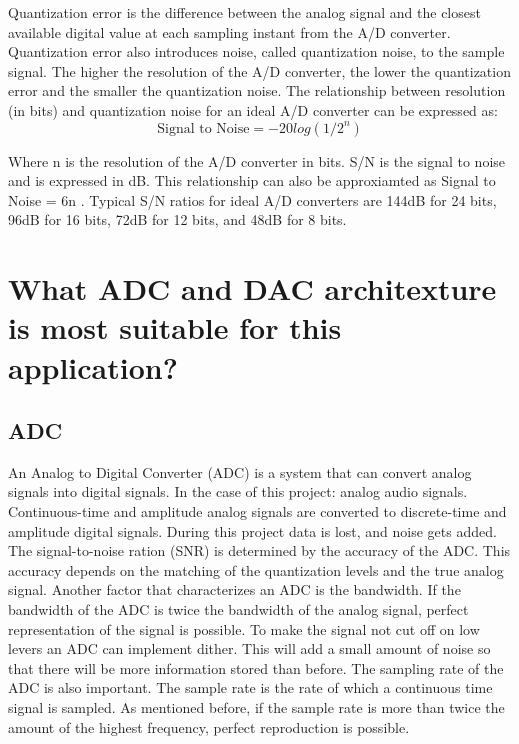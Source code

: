 Quantization error is the difference between the analog signal and the closest available digital value at each sampling instant from the A/D converter. Quantization error also introduces noise, called quantization noise, to the sample signal. The higher the resolution of the A/D converter, the lower the quantization error and the smaller the quantization noise. The relationship between resolution (in bits) and quantization noise for an ideal A/D converter can be expressed as:\\
\begin{equation} \label{eqn}
	\text{Signal to Noise} = {-20 log(1/2^{n})} 
	\end{equation}   

Where n is the resolution of the A/D converter in bits. S/N is the signal to noise and is expressed in dB. This relationship can also be approxiamted as Signal to Noise = {6n} . 
Typical S/N ratios for ideal A/D converters are 144dB for 24 bits, 96dB for 16 bits, 72dB for 12 bits, and 48dB for 8 bits.\\


\section{What ADC and DAC architexture is most suitable for this application?}
        \subsection{ADC}
        An Analog to Digital Converter (ADC) is a system that can convert analog signals into digital signals. In the case of this project: analog audio signals.
Continuous-time and amplitude analog signals are converted to discrete-time and amplitude digital signals. During this project data is lost, and noise gets added. The signal-to-noise ration (SNR) is determined by the accuracy of the ADC. This accuracy depends on the matching of the quantization levels and the true analog signal. Another factor that characterizes an ADC is the bandwidth. If the bandwidth of the ADC is twice the bandwidth of the analog signal, perfect representation of the signal is possible. 
To make the signal not cut off on low levers an ADC can implement dither. This will add a small amount of noise so that there will be more information stored than before. 
The sampling rate of the ADC is also important. The sample rate is the rate of which a continuous time signal is sampled. As mentioned before, if the sample rate is more than twice the amount of the highest frequency, perfect reproduction is possible. \\

